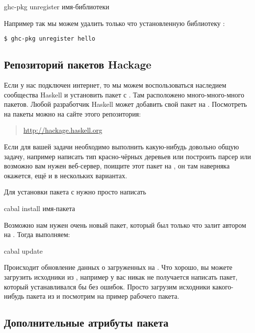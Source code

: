 \begin{code}
ghc-pkg unregister имя-библиотеки
\end{code}

Например так мы можем удалить только что установленную библиотеку
:


\begin{verbatim}
$ ghc-pkg unregister hello
\end{verbatim}

\subsection{Репозиторий пакетов Hackage}

Если у нас подключен интернет, то мы можем воспользоваться наследием
сообщества Haskell и установить пакет с . Там расположено
много-много-много пакетов. Любой разработчик Haskell может добавить свой
пакет на . Посмотреть на пакеты можно на сайте этого
репозитория:

\begin{quote}
\url{http://hackage.haskell.org}
\end{quote}

Если для вашей задачи необходимо выполнить какую-нибудь довольно общую
задачу, например написать тип красно-чёрных деревьев или построить
парсер или возможно вам нужен веб-сервер, поищите этот пакет на
, он там наверняка окажется, ещё и в нескольких вариантах.

Для установки пакета с  нужно просто написать


\begin{code}
cabal install имя-пакета
\end{code}

Возможно нам нужен очень новый пакет, который был только что залит
автором на . Тогда выполняем:


\begin{code}
cabal update
\end{code}

Происходит обновление данных о загруженных на . Что хорошо,
вы можете загрузить исходники из , например у вас никак не
получается написать пакет, который устанавливался бы без ошибок. Просто
загрузим исходники какого-нибудь пакета из  и посмотрим на
пример рабочего пакета.

\subsection{Дополнительные атрибуты пакета}

